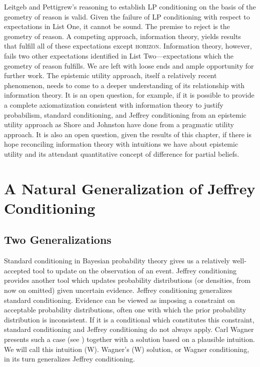 \documentclass[phd,12pt,oneside]{ubcthesis}
\begin{document}
Leitgeb and Pettigrew's reasoning to establish LP conditioning on the
basis of the geometry of reason is valid. Given the failure of LP
conditioning with respect to expectations in List One, it cannot be
sound. The premise to reject is the geometry of reason. A competing
approach, information theory, yields results that fulfill all of these
expectations except \textsc{horizon}. Information theory, however,
fails two other expectations identified in List Two---expectations
which the geometry of reason fulfills. We are left with loose ends and
ample opportunity for further work. The epistemic utility approach,
itself a relatively recent phenomenon, needs to come to a deeper
understanding of its relationship with information theory. It is an
open question, for example, if it is possible to provide a complete
axiomatization consistent with information theory to justify
probabilism, standard conditioning, and Jeffrey conditioning from an
epistemic utility approach as Shore and Johnston have done from a
pragmatic utility approach. It is also an open question, given the
results of this chapter, if there is hope reconciling information theory
with intuitions we have about epistemic utility and its attendant
quantitative concept of difference for partial beliefs.

\chapter{A Natural Generalization of Jeffrey Conditioning}
\label{chp:eejiegei}

\section{Two Generalizations}
\label{sec:euboonei}

Standard conditioning in Bayesian probability theory gives us a
relatively well-accepted tool to update on the observation of an
event. Jeffrey conditioning provides another tool which updates
probability distributions (or densities, from now on omitted) given
uncertain evidence. Jeffrey conditioning generalizes standard
conditioning. Evidence can be viewed as imposing a constraint on
acceptable probability distributions, often one with which the prior
probability distribution is inconsistent. If it is a conditional which
constitutes this constraint, standard conditioning and Jeffrey
conditioning do not always apply. Carl Wagner presents such a case
(see ) together with a solution based on a
plausible intuition. We will call this intuition (W). Wagner's (W)
solution, or Wagner conditioning, in its turn generalizes Jeffrey
conditioning.
\end{document}
